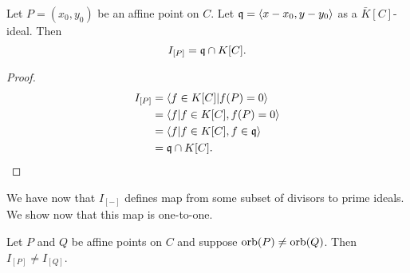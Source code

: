 \begin{proposition}
  Let $P = (x_0, y_0)$ be an affine point on $C$.
  Let $\frak q = \left\langle x - x_0, y - y_0 \right\rangle$ as a $\bar K[C]$-ideal. Then
  \[ I_{[P]} = \frak q \cap K[C]. \]
\end{proposition}
\begin{proof}
  \begin{align*}
    I_{[P]}
      &= \left\langle  f \in K[C] | f(P) = 0  \right\rangle \\
      &= \left\langle  f | f \in K[C], f(P) = 0  \right\rangle \\
      &= \left\langle  f | f \in K[C], f \in \frak q  \right\rangle \\
      &= \frak q \cap K[C].
  \end{align*}
\end{proof}

We have now that $I_{[-]}$ defines map from some subset of divisors to prime ideals.
We show now that this map is one-to-one.
\begin{proposition}
  Let $P$ and $Q$ be affine points on $C$ and suppose $\operatorname{orb}(P) \neq \operatorname{orb}(Q)$.
  Then $I_{[P]} \neq I_{[Q]}$.
\end{proposition}
